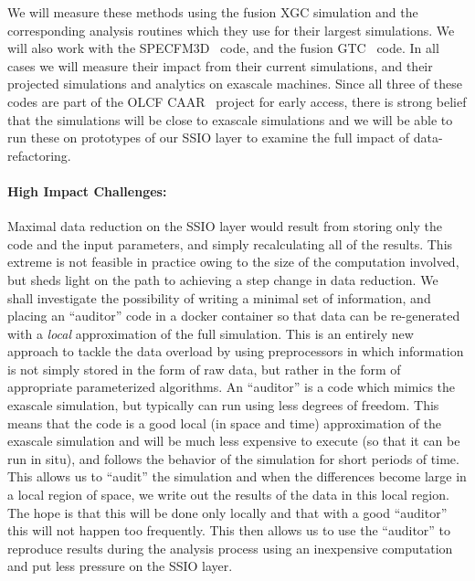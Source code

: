 We will measure these methods using the fusion XGC simulation and the
corresponding analysis routines which they use for their largest simulations.
We will also work with the SPECFM3D~\cite{SPECFEM3D} code, and the
fusion GTC~\cite{klasky2003grid} code.  In all cases we will measure their
impact from their current simulations, and their projected simulations and
analytics on exascale machines. Since all three of these codes are part of the
OLCF CAAR~\cite{CAAR} project for early access, there is strong belief that the
simulations will be close to exascale simulations and we will be able to run
these on prototypes of our SSIO layer to examine the full impact of
data-refactoring.

\paragraph{High Impact Challenges:} Maximal data reduction on the SSIO layer
would result from storing only the code and the input parameters, and simply
recalculating all of the results. This extreme is not feasible in practice
owing to the size of the computation involved, but sheds light on the path to
achieving a step change in data reduction. We shall investigate the possibility
of writing a minimal set of information, and placing an ``auditor'' code in a
docker container so that data can be re-generated with a {\em local}
approximation of the full simulation. This is an entirely new approach to
tackle the data overload by using preprocessors in which information is not
simply stored in the form of raw data, but rather in the form of appropriate
parameterized algorithms. An ``auditor'' is a code which mimics the exascale simulation, 
but typically can run using less degrees of freedom. This means that the code is a good
local (in space and time) approximation of the exascale simulation and will be much less
expensive to execute (so that it can be run in situ), and follows the behavior of the simulation
for short periods of time. This allows us to ``audit'' the simulation and when the differences 
become large in a local region of space, we write out the results of the data in this local region.
The hope is that this will be done only locally and that with a good ``auditor''  this will not happen
too frequently. This then allows us to use the ``auditor'' to reproduce results during the analysis 
process using an inexpensive computation and put less pressure on the SSIO layer.
%
% 

